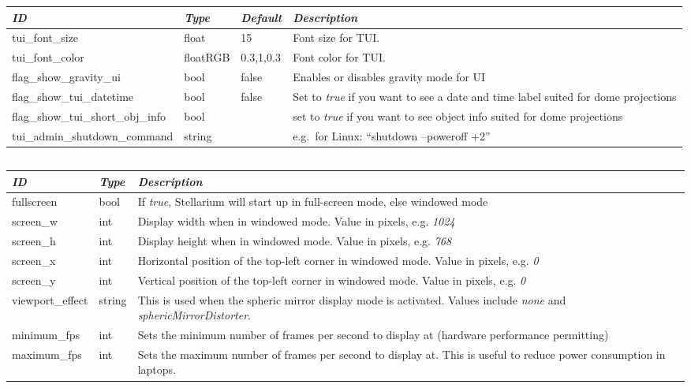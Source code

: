 \begin{longtabu} to \textwidth {l|l|l|X}\toprule
\emph{ID} & \emph{Type} &\emph{Default}& \emph{Description}\\\midrule
tui\_font\_size           &float    &15       &Font size for TUI.\\\midrule
tui\_font\_color          &floatRGB &0.3,1,0.3&Font color for TUI.\\\midrule
flag\_show\_gravity\_ui   & bool    &false    & Enables or disables gravity mode for UI\\\midrule
flag\_show\_tui\_datetime & bool    &false    &Set to \emph{true} if you want to see a date and time label suited for dome projections\\\midrule
flag\_show\_tui\_short\_obj\_info   & bool&    &set to \emph{true} if you want to see object info suited for dome projections\\\midrule
tui\_admin\_shutdown\_command       & string  && e.g.\ for Linux: ``shutdown --poweroff +2'' \\\bottomrule
\end{longtabu}

\subsection{}\label{sec:config.ini:video}

\begin{longtabu} to \textwidth {l|l|X}\toprule
\emph{ID}  & \emph{Type} & \emph{Description}\\\midrule
fullscreen       & bool   & If \emph{true}, Stellarium will start up in full-screen mode, else windowed mode\\\midrule
screen\_w        & int    & Display width when in windowed mode. Value in pixels, e.g. \emph{1024}\\\midrule
screen\_h        & int    & Display height when in windowed mode. Value in pixels, e.g. \emph{768}\\\midrule
screen\_x        & int    & Horizontal position of the top-left corner in windowed mode. Value in pixels, e.g. \emph{0}\\\midrule
screen\_y        & int    & Vertical   position of the top-left corner in windowed mode. Value in pixels, e.g. \emph{0}\\\midrule
viewport\_effect & string & This is used when the spheric mirror display mode is activated. Values include \emph{none} and \emph{sphericMirrorDistorter}.\\\midrule
minimum\_fps     & int    & Sets the minimum number of frames per second to display at (hardware performance permitting)\\\midrule
maximum\_fps     & int    & Sets the maximum number of frames per second to display at. This is useful to reduce power consumption in laptops.\\\bottomrule
\end{longtabu}

